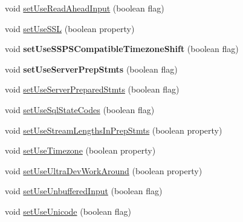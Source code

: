 \begin{DoxyCompactItemize}
\item 
void \mbox{\hyperlink{classcom_1_1mysql_1_1jdbc_1_1jdbc2_1_1optional_1_1_connection_wrapper_ae880ea3eac682792cff918e06fddbb3b}{set\+Use\+Read\+Ahead\+Input}} (boolean flag)
\item 
void \mbox{\hyperlink{classcom_1_1mysql_1_1jdbc_1_1jdbc2_1_1optional_1_1_connection_wrapper_afe754fe2674d4bbab1ba44cb09a81db6}{set\+Use\+S\+SL}} (boolean property)
\item 
\mbox{\label{classcom_1_1mysql_1_1jdbc_1_1jdbc2_1_1optional_1_1_connection_wrapper_a682f1f90dc7966305beb265296886fdc}} 
void {\bfseries set\+Use\+S\+S\+P\+S\+Compatible\+Timezone\+Shift} (boolean flag)
\item 
\mbox{\label{classcom_1_1mysql_1_1jdbc_1_1jdbc2_1_1optional_1_1_connection_wrapper_a5327a37ba5efa828aa73ac20f0a97b86}} 
void {\bfseries set\+Use\+Server\+Prep\+Stmts} (boolean flag)
\item 
void \mbox{\hyperlink{classcom_1_1mysql_1_1jdbc_1_1jdbc2_1_1optional_1_1_connection_wrapper_a87cc13b16614e7a9ab998e64518d35bd}{set\+Use\+Server\+Prepared\+Stmts}} (boolean flag)
\item 
void \mbox{\hyperlink{classcom_1_1mysql_1_1jdbc_1_1jdbc2_1_1optional_1_1_connection_wrapper_a5a221de19389e4c32fffb7532d8816ff}{set\+Use\+Sql\+State\+Codes}} (boolean flag)
\item 
void \mbox{\hyperlink{classcom_1_1mysql_1_1jdbc_1_1jdbc2_1_1optional_1_1_connection_wrapper_a9eadd4adb9ecde242f0656084f31f8c7}{set\+Use\+Stream\+Lengths\+In\+Prep\+Stmts}} (boolean property)
\item 
void \mbox{\hyperlink{classcom_1_1mysql_1_1jdbc_1_1jdbc2_1_1optional_1_1_connection_wrapper_aceb697ff05de0e9bcd43256ff2a7d47a}{set\+Use\+Timezone}} (boolean property)
\item 
void \mbox{\hyperlink{classcom_1_1mysql_1_1jdbc_1_1jdbc2_1_1optional_1_1_connection_wrapper_a975975f724eda5350e1b096e2525a70c}{set\+Use\+Ultra\+Dev\+Work\+Around}} (boolean property)
\item 
void \mbox{\hyperlink{classcom_1_1mysql_1_1jdbc_1_1jdbc2_1_1optional_1_1_connection_wrapper_ad2f5596971575bf1d10abdea85e86509}{set\+Use\+Unbuffered\+Input}} (boolean flag)
\item 
void \mbox{\hyperlink{classcom_1_1mysql_1_1jdbc_1_1jdbc2_1_1optional_1_1_connection_wrapper_aad47efde1fa5f5f876ed766cf6b01a43}{set\+Use\+Unicode}} (boolean flag)

\end{DoxyCompactItemize}

